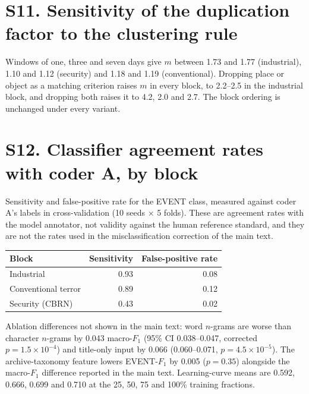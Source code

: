 \documentclass[11pt]{article}
\begin{document}
\section*{S11. Sensitivity of the duplication factor to the clustering rule}
Windows of one, three and seven days give $m$ between 1.73 and 1.77 (industrial), 1.10 and 1.12 (security) and 1.18 and 1.19 (conventional). Dropping place or object as a matching criterion raises $m$ in every block, to 2.2--2.5 in the industrial block, and dropping both raises it to 4.2, 2.0 and 2.7. The block ordering is unchanged under every variant.


\section*{S12. Classifier agreement rates with coder A, by block}
Sensitivity and false-positive rate for the EVENT class, measured against coder A's labels in cross-validation (10 seeds $\times$ 5 folds). These are agreement rates with the model annotator, not validity against the human reference standard, and they are not the rates used in the misclassification correction of the main text.\\[4pt]
\begin{tabular}{lrr}\toprule Block & Sensitivity & False-positive rate \\\midrule
Industrial & 0.93 & 0.08 \\
Conventional terror & 0.89 & 0.12 \\
Security (CBRN) & 0.43 & 0.02 \\
\bottomrule\end{tabular}

Ablation differences not shown in the main text: word $n$-grams are worse than character $n$-grams by 0.043 macro-$F_1$ (95\% CI 0.038--0.047, corrected $p = 1.5\times10^{-4}$) and title-only input by 0.066 (0.060--0.071, $p = 4.5\times10^{-5}$). The archive-taxonomy feature lowers EVENT-$F_1$ by 0.005 ($p = 0.35$) alongside the macro-$F_1$ difference reported in the main text. Learning-curve means are 0.592, 0.666, 0.699 and 0.710 at the 25, 50, 75 and 100\% training fractions.
\end{document}
